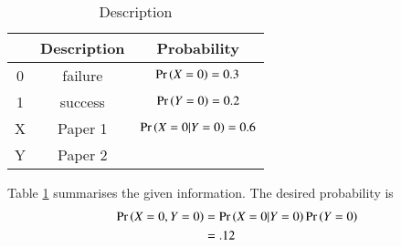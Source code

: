 \begin{table}[!ht]
    \centering
    \begin{tabular}{|c|c|c|}
    \hline
         &Description  & Probability \\
         \hline
         0&failure & $\Pr\left(X=0\right) = 0.3$\\
         \hline
         1&success & $\Pr\left(Y=0\right) = 0.2$\\
         \hline
         X&Paper 1 & $\Pr\left(X=0|Y=0\right) = 0.6$\\
         \hline
         Y&Paper 2 & \\
         \hline
    \end{tabular}
    \caption{Description}
    \label{table:axioms/3}
\end{table}
%
Table \ref{table:axioms/3} summarises the given information.  The desired probability is
%
    \begin{align}
        \Pr\left(X=0,Y=0\right) &= \Pr\left(X=0|Y=0\right)\Pr\left(Y=0\right)\\ 
        &=.12
       \end{align}
